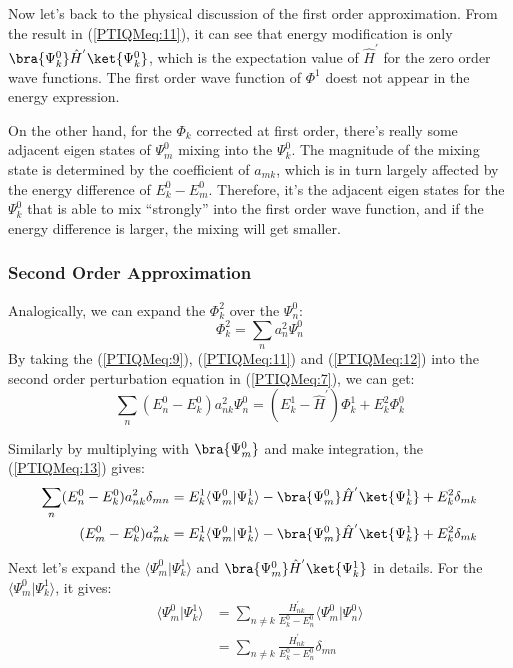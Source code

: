 Now let's back to the physical discussion of the first order
approximation. From the result in (\ref{PTIQMeq:11}), it can see
that energy modification is only
$\bra{\Psi^{0}_{k}}\hat{H}^{'}\ket{\Psi^{0}_{k}}$, which is the
expectation value of $\hat{H}^{'}$ for the zero order wave
functions. The first order wave function of $\Phi^{1}$ doest not
appear in the energy expression.

On the other hand, for the $\Phi_{k}$ corrected at first order,
there's really some adjacent eigen states of $\Psi^{0}_{m}$ mixing
into the $\Psi^{0}_{k}$. The magnitude of the mixing state is
determined by the coefficient of $a_{mk}$, which is in turn largely
affected by the energy difference of $E^{0}_{k} - E^{0}_{m}$.
Therefore, it's the adjacent eigen states for the $\Psi^{0}_{k}$
that is able to mix ``strongly'' into the first order wave function,
and if the energy difference is larger, the mixing will get smaller.

\subsubsection{Second Order Approximation}
Analogically, we can expand the $\Phi^{2}_{k}$ over the
$\Psi^{0}_{n}$:
\begin{equation}\label{PTIQMeq:12}
\Phi^{2}_{k} = \sum_{n}a^{2}_{n}\Psi^{0}_{n}
\end{equation}
By taking the (\ref{PTIQMeq:9}), (\ref{PTIQMeq:11}) and
(\ref{PTIQMeq:12}) into the second order perturbation equation in
(\ref{PTIQMeq:7}), we can get:
\begin{equation}\label{PTIQMeq:13}
\sum_{n}(E^{0}_{n} - E^{0}_{k})a^{2}_{nk}\Psi^{0}_{n} = (E^{1}_{k} -
\hat{H}^{'})\Phi^{1}_{k} + E^{2}_{k}\Phi^{0}_{k}
\end{equation}

Similarly by multiplying with $\bra{\Psi^{0}_{m}}$ and make
integration, the (\ref{PTIQMeq:13}) gives:
\begin{align}\label{PTIQMeq:14}
\sum_{n}(E^{0}_{n} - E^{0}_{k})a^{2}_{nk}\delta_{mn} &=
E^{1}_{k}\langle\Psi^{0}_{m}|\Psi^{1}_{k}\rangle -
\bra{\Psi^{0}_{m}}\hat{H}^{'}\ket{\Psi^{1}_{k}} +
E^{2}_{k}\delta_{mk} \nonumber \\
(E^{0}_{m} - E^{0}_{k})a^{2}_{mk} &=
E^{1}_{k}\langle\Psi^{0}_{m}|\Psi^{1}_{k}\rangle -
\bra{\Psi^{0}_{m}}\hat{H}^{'}\ket{\Psi^{1}_{k}} +
E^{2}_{k}\delta_{mk}
\end{align}

Next let's expand the $\langle\Psi^{0}_{m}|\Psi^{1}_{k}\rangle$ and
$\bra{\Psi^{0}_{m}}\hat{H}^{'}\ket{\Psi^{1}_{k}}$ in details. For
the $\langle\Psi^{0}_{m}|\Psi^{1}_{k}\rangle$, it gives:
\begin{align}\label{PTIQMeq:15}
\langle\Psi^{0}_{m}|\Psi^{1}_{k}\rangle &= \sum_{n\neq
k}\frac{H^{'}_{nk}}{E^{0}_{k} - E^{0}_{n}}
\langle\Psi^{0}_{m}|\Psi^{0}_{n}\rangle \nonumber \\
&=\sum_{n\neq k}\frac{H^{'}_{nk}}{E^{0}_{k} - E^{0}_{n}}\delta_{mn}
\end{align}

